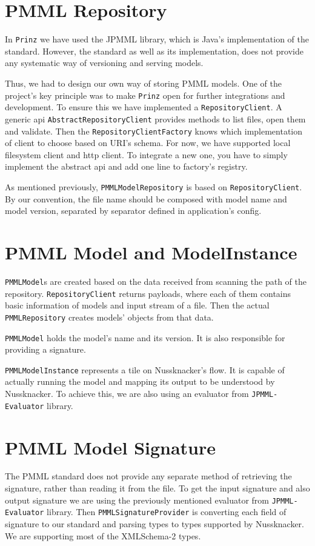 \section{PMML Repository}

In \texttt{Prinz} we have used the JPMML library, which is Java’s implementation of the standard. However,
the standard as well as its implementation, does not provide any systematic way of versioning and serving models.

Thus, we had to design our own way of storing PMML models. One of the project’s key principle was
to make \texttt{Prinz} open for further integrations and development. To ensure this we have implemented a \texttt{RepositoryClient}.
A generic api \texttt{AbstractRepositoryClient} provides methods to list files, open them and validate. Then the \texttt{RepositoryClientFactory}
knows which implementation of client to choose based on URI’s schema. For now, we have supported local filesystem client and http client.
To integrate a new one, you have to simply implement the abstract api and add one line to factory’s registry.

As mentioned previously, \texttt{PMMLModelRepository} is based on \texttt{RepositoryClient}. By our convention,
the file name should be composed with model name and model version, separated by separator defined in application’s config.

\section{PMML Model and ModelInstance}

\texttt{PMMLModel}s are created based on the data received from scanning the path of the repository.
\texttt{RepositoryClient} returns payloads, where each of them contains basic information of models and input stream of a file.
Then the actual \texttt{PMMLRepository} creates models’ objects from that data.

\texttt{PMMLModel} holds the model’s name and its version. It is also responsible for providing a signature.

\texttt{PMMLModelInstance} represents a tile on Nussknacker’s flow. It is capable of actually running the model and mapping its output to be understood by Nussknacker.
To achieve this, we are also using an evaluator from \texttt{JPMML-Evaluator} library.

\section{PMML Model Signature}

The PMML standard does not provide any separate method of retrieving the signature, rather than reading it from the file.
To get the input signature and also output signature we are using the previously mentioned evaluator from \texttt{JPMML-Evaluator} library.
Then \texttt{PMMLSignatureProvider} is converting each field of signature to our standard and parsing types to types supported by Nussknacker.
We are supporting most of the XMLSchema-2 types.
